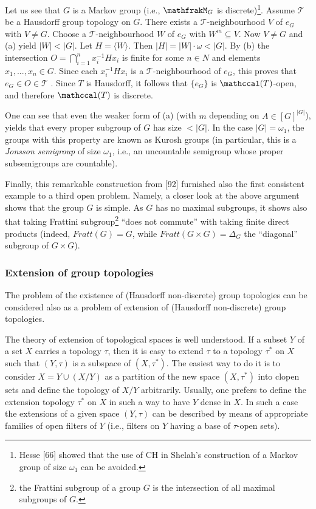 \documentclass[12pt]{article}
\begin{document}
    Let us see that $G$ is a Markov group (i.e., $\mathfrakM_G$ is discrete)\footnote[7]{Hesse [66] showed that the use of CH in Shelah's construction of a Markov group of size $\omega_1$ can be avoided.}. Assume $\mathcal{T}$ be a Hausdorff group topology on $G$. There
exists a $\mathcal{T}$-neighbourhood $V$ of $e_G$ with $V \neq G$. Choose a $\mathcal{T}$-neighbourhood $W$ of $e_G$ with $W^m \subseteq V$. Now $V \neq G$
and (a) yield $|W| < |G|$. Let $H = \langle W \rangle$. Then $|H| = |W| · \omega < |G|$. By (b) the intersection $O = \bigcap^n_{i=1} x^{-1}_i Hx_i$ is
finite for some $n \in N$ and elements $x_1, . . . , x_n \in G$. Since each $x^{-1}_i Hx_i$ is a $\mathcal{T}$-neighbourhood of $e_G$, this proves
that $e_G \in O \in \mathcal{T}$ . Since $T$ is Hausdorff, it follows that $\{e_G\}$ is $\mathccal(T)$-open, and therefore $\mathccal(T)$ is discrete.


    One can see that even the weaker form of (a) (with $m$ depending on $A \in [G]^{|G|}$), yields that every proper
subgroup of $G$ has size $< |G|$. In the case $|G| = \omega_1$, the groups with this property are known as Kurosh groups (in
particular, this is a \emph{Jonsson semigroup} of size $\omega_1$, i.e., an uncountable semigroup whose proper subsemigroups
are countable).


    Finally, this remarkable construction from [92] furnished also the first consistent example to a third open
problem. Namely, a closer look at the above argument shows that the group $G$ is simple. As $G$ has no maximal
subgroups, it shows also that taking Frattini subgroup\footnote[8]{the Frattini subgroup of a group $G$ is the intersection of all maximal subgroups of $G$.} “does not commute” with taking finite direct products
(indeed, $Fratt(G) = G$, while $Fratt(G \times G) = \Delta_G$ the “diagonal” subgroup of $G \times G$).


\subsubsection{Extension of group topologies}
    The problem of the existence of (Hausdorff non-discrete) group topologies can be considered also as a problem
of extension of (Hausdorff non-discrete) group topologies.


    The theory of extension of topological spaces is well understood. If a subset $Y$ of a set $X$ carries a topology
$\tau$, then it is easy to extend $\tau$ to a topology $\tau^*$ on $X$ such that $(Y, \tau)$ is a subspace of $(X, τ^*)$. The easiest way
to do it is to consider $X = Y \cup (X / Y )$ as a partition of the new space $(X, \tau^*)$ into clopen sets and define
the topology of $X / Y$ arbitrarily. Usually, one prefers to define the extension topology $\tau^*$ on $X$ in such a way
to have $Y$ dense in $X$. In such a case the extensions of a given space $(Y, \tau)$ can be described by means of
appropriate families of open filters of $Y$ (i.e., filters on $Y$ having a base of $\tau$-open sets).
\end{document}
